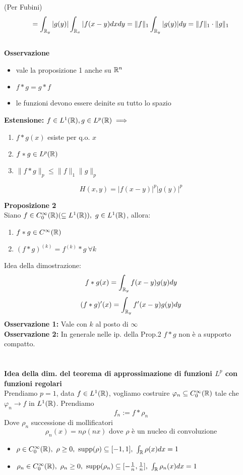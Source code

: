 (Per Fubini)
\[=\int_{\mathbb{R}_y}^{} |g(y)| \int_{\mathbb{R}_x}^{} |f(x-y)dxdy=\|f\|_1 \int_{\mathbb{R}_y}^{} |g(y)|dy=\|f\|_1\cdot \|g\|_1\]   
\divider\\
\textbf{Osservazione}
\begin{itemize}
	\item vale la proposizione 1 anche su $\mathbb{R}^n$ 
	\item $f* g=g * f$ 
	\item le funzioni devono essere deinite su tutto lo spazio
\end{itemize}
\textbf{Estensione:} $f\in L^{1}(\mathbb{R}),g\in L^{p}(\mathbb{R})\implies$
\begin{enumerate}
	\item $f * g(x)$ esiste per q.o. $x$ 
	\item $f*g\in L^{p}(\mathbb{R})$ 
	\item $\|f * g\|_p\le \|f\|_1 \|g\|_p$
\end{enumerate}
\[H(x,y)=|f(x-y)|^p|g(y)|^p\]
\begin{tcolorbox}
	\textbf{Proposizione 2} 
	\\Siano $f\in C_0^\infty(\mathbb{R})(\subseteq  L^{1}(\mathbb{R})),\ g\in L^{1}(\mathbb{R})$, allora:
	\begin{enumerate}
		\item $f*g\in C^\infty(\mathbb{R})$ 
		\item $(f*g)^{(k)}=f^{(k)}*g\ \forall k$
	\end{enumerate}
\end{tcolorbox}
Idea della dimostrazione: 
\[f * g(x)=\int_{\mathbb{R}_y}^{} f(x-y)g(y)dy\]
\[(f *g)'(x)=\int_{\mathbb{R}_y}^{} f'(x-y)g(y)dy\]
\textbf{Osservazione 1:} 
Vale con $k$ al posto di $\infty$\\
\textbf{Osservazione 2:} In generale nelle ip. della Prop.2 $f*g$ non è a supporto compatto. 
\\\divider\\
\\\textbf{Idea della dim. del teorema di approssimazione di funzioni $L ^p$ con funzioni regolari}
\\Prendiamo $p=1$, data $f\in L^{1}(\mathbb{R})$, vogliamo costruire $\varphi_n\subseteq  C_0^\infty(\mathbb{R})$ tale che $\varphi_n\to f$ in $L^{1}(\mathbb{R})$. Prendiamo
\[f_n:=f*\rho_n\]
Dove $\rho_n$ successione di mollificatori
\[\rho_n(x)=n\rho(nx) \text{ dove }\rho \text{ è un nucleo di convoluzione}\]
\begin{itemize}
	\item $\rho\in C_0^\infty(\R),\ \rho\ge 0,\ \text{supp}(\rho)\subseteq  [-1,1],\ \int_{\R}^{} \rho(x)dx=1$ 
	\item $\rho_n\in C^\infty_0(\R),\ \rho_n\ge 0,\text{ supp}(\rho_n)\subseteq [-\frac{1}{n},\frac{1}{n}],\ \int_{\R}^{} \rho_n(x)dx=1 $
\end{itemize}
